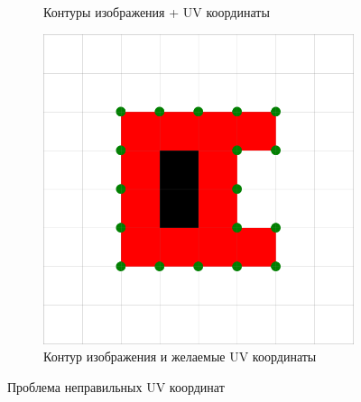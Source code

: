 \documentclass{fefu_thesis/cls/fefu}
\begin{document}
\begin{figure}[H]
\begin{subfigure}[t]{.33\linewidth}
            \caption{Контуры изображения + UV координаты}
        \end{subfigure}
        \begin{subfigure}[t]{.32\linewidth}
            \centering
            \includegraphics[scale=0.2]{images/SuzukiExample2_wanted_uvs.png}
            \caption{Контур изображения и желаемые UV координаты}
        \end{subfigure}
        \caption{Проблема неправильных UV координат}
    \end{figure}
\end{document}
